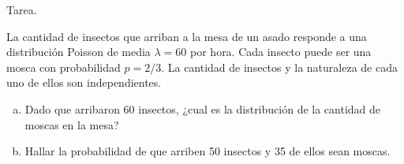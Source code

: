 \documentclass{beamer}
\begin{document}
\begin{frame}[fragile]{Tarea.}
  
La cantidad de insectos que arriban a la mesa de un asado responde
a una distribución Poisson de media $\lambda = 60$ por hora. Cada insecto
puede ser una mosca con probabilidad $p = 2/3$. La cantidad de insectos
y la naturaleza de cada uno de ellos son independientes.

\begin{enumerate}[a)]
  \item Dado que arribaron 60 insectos, ¿cual es la distribución de la
  cantidad de moscas en la mesa?
  
  \item Hallar la probabilidad de que arriben 50 insectos y 35 de ellos
  sean moscas.
\end{enumerate}
\end{frame}
\end{document}
